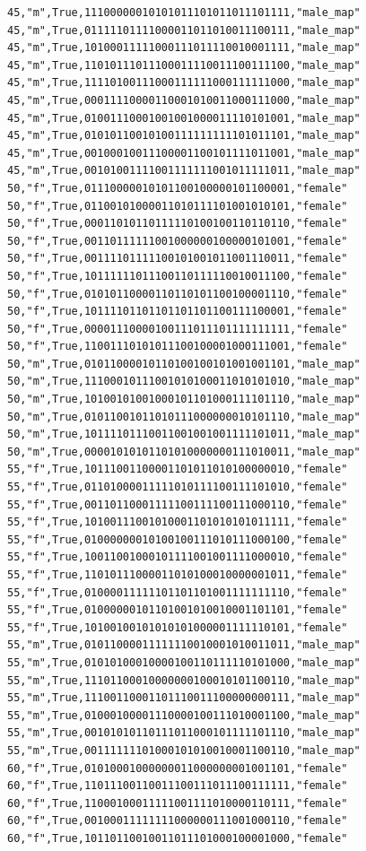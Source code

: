 \documentclass[authoryearcitations]{UoYCSproject}
\begin{document}
\begin{framed}
\begin{verbatim}
45,"m",True,11100000010101011101011011101111,"male_map"
45,"m",True,01111101111000011011010011100111,"male_map"
45,"m",True,10100011111000111011110010001111,"male_map"
45,"m",True,11010111011100011110011100111100,"male_map"
45,"m",True,11110100111000111111000111111000,"male_map"
45,"m",True,00011110000110001010011000111000,"male_map"
45,"m",True,01001110001001001000011110101001,"male_map"
45,"m",True,01010110010100111111111101011101,"male_map"
45,"m",True,00100010011100001100101111011001,"male_map"
45,"m",True,00101001111001111111001011111011,"male_map"
50,"f",True,01110000010101100100000101100001,"female"
50,"f",True,01100101000011010111101001010101,"female"
50,"f",True,00011010110111110100100110110110,"female"
50,"f",True,00110111111001000000100000101001,"female"
50,"f",True,00111101111100101001011001110011,"female"
50,"f",True,10111111011100110111110010011100,"female"
50,"f",True,01010110000110110101100100001110,"female"
50,"f",True,10111101101101101101100111100001,"female"
50,"f",True,00001110000100111011101111111111,"female"
50,"f",True,11001110101011100100001000111001,"female"
50,"m",True,01011000010110100100101001001101,"male_map"
50,"m",True,11100010111001010100011010101010,"male_map"
50,"m",True,10100101001000101101000111101110,"male_map"
50,"m",True,01011001011010111000000010101110,"male_map"
50,"m",True,10111101110011001001001111101011,"male_map"
50,"m",True,00001010101101010000000111010011,"male_map"
55,"f",True,10111001100001101011010100000010,"female"
55,"f",True,01101000011111010111100111101010,"female"
55,"f",True,00110110001111100111100111000110,"female"
55,"f",True,10100111001010001101010101011111,"female"
55,"f",True,01000000010100100111010111000100,"female"
55,"f",True,10011001000101111001001111000010,"female"
55,"f",True,11010111000011010100010000001011,"female"
55,"f",True,01000011111101101101001111111110,"female"
55,"f",True,01000000101101001010010001101101,"female"
55,"f",True,10100100101010101000001111110101,"female"
55,"m",True,01011000011111110010001010011011,"male_map"
55,"m",True,01010100010000100110111110101000,"male_map"
55,"m",True,11101100010000000100010101100110,"male_map"
55,"m",True,11100110001101110011100000000111,"male_map"
55,"m",True,01000100001110000100111010001100,"male_map"
55,"m",True,00101010110111011000101111101110,"male_map"
55,"m",True,00111111101000101010010001100110,"male_map"
60,"f",True,01010001000000011000000001001101,"female"
60,"f",True,11011100110011100111011100111111,"female"
60,"f",True,11000100011111001111010000110111,"female"
60,"f",True,00100011111111000000111001000110,"female"
60,"f",True,10110110010011011101000100001000,"female"

\end{verbatim}
\end{framed}
\end{document}
